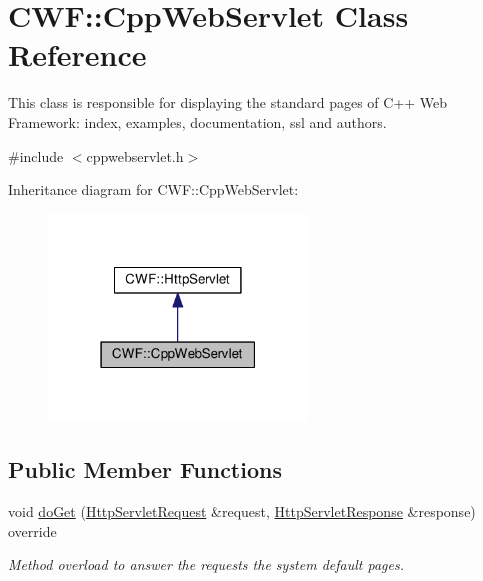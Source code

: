 \hypertarget{class_c_w_f_1_1_cpp_web_servlet}{\section{C\+W\+F\+:\+:Cpp\+Web\+Servlet Class Reference}
\label{class_c_w_f_1_1_cpp_web_servlet}
}


This class is responsible for displaying the standard pages of C++ Web Framework\+: index, examples, documentation, ssl and authors.  




{\ttfamily \#include $<$cppwebservlet.\+h$>$}



Inheritance diagram for C\+W\+F\+:\+:Cpp\+Web\+Servlet\+:
\nopagebreak
\begin{figure}[H]
\begin{center}
\leavevmode
\includegraphics[width=195pt]{class_c_w_f_1_1_cpp_web_servlet__inherit__graph}
\end{center}
\end{figure}
\subsection*{Public Member Functions}
\begin{DoxyCompactItemize}
\item 
void \hyperlink{class_c_w_f_1_1_cpp_web_servlet_a0dca0ce47c2c1d8ecd8d8493773575f8}{do\+Get} (\hyperlink{class_c_w_f_1_1_http_servlet_request}{Http\+Servlet\+Request} \&request, \hyperlink{class_c_w_f_1_1_http_servlet_response}{Http\+Servlet\+Response} \&response) override
\begin{DoxyCompactList}\small\item\em Method overload to answer the requests the system default pages. \end{DoxyCompactList}\end{DoxyCompactItemize}


